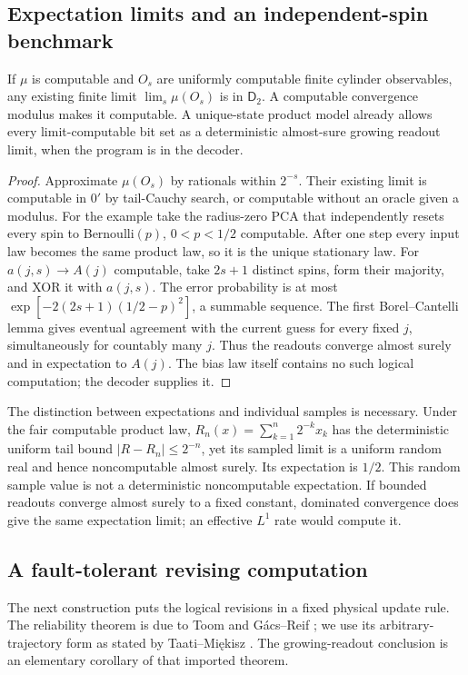 \subsection{Expectation limits and an independent-spin benchmark}
\begin{proposition}\label{prop:state-limits}
If $\mu$ is computable and $O_s$ are uniformly computable finite
cylinder observables, any existing finite limit $\lim_s\mu(O_s)$
is in $\mathsf D_2$. A computable convergence modulus makes it
computable. A unique-state product model already allows every
limit-computable bit set as a deterministic almost-sure growing
readout limit, when the program is in the decoder.
\end{proposition}
\begin{proof}
Approximate $\mu(O_s)$ by rationals within $2^{-s}$. Their existing
limit is computable in $0'$ by tail-Cauchy search, or computable
without an oracle given a modulus. For the example take the
radius-zero PCA that independently resets every spin to
Bernoulli$(p)$, $0<p<1/2$ computable. After one step every input
law becomes the same product law, so it is the unique stationary law.
For $a(j,s)\to A(j)$ computable, take $2s+1$ distinct spins,
form their majority, and XOR it with $a(j,s)$.
The error probability is at most
$\exp[-2(2s+1)(1/2-p)^2]$, a summable sequence. The first
Borel--Cantelli lemma gives eventual agreement with the current
guess for every fixed $j$, simultaneously for countably many $j$.
Thus the readouts converge almost surely and in expectation to
$A(j)$. The bias law itself contains no such logical computation;
the decoder supplies it.
\end{proof}

The distinction between expectations and individual samples is
necessary. Under the fair computable product law,
$R_n(x)=\sum_{k=1}^n2^{-k}x_k$ has the deterministic uniform tail
bound $|R-R_n|\leq2^{-n}$, yet its sampled limit is a uniform random
real and hence noncomputable almost surely. Its expectation is
$1/2$. This random sample value is not a deterministic
noncomputable expectation. If bounded readouts converge almost
surely to a fixed constant, dominated convergence does give the
same expectation limit; an effective $L^1$ rate would compute it.

\subsection{A fault-tolerant revising computation}
\label{subsec:reliable-readout}
The next construction puts the logical revisions in a fixed
physical update rule. The reliability theorem is due to Toom and
G\'acs--Reif \cite{toom,gacsReif}; we use its arbitrary-trajectory
form as stated by Taati--Mi\k{e}kisz
\cite[Theorem~3.1]{thermalTrajectories}. The growing-readout conclusion
is an elementary corollary of that imported theorem.

